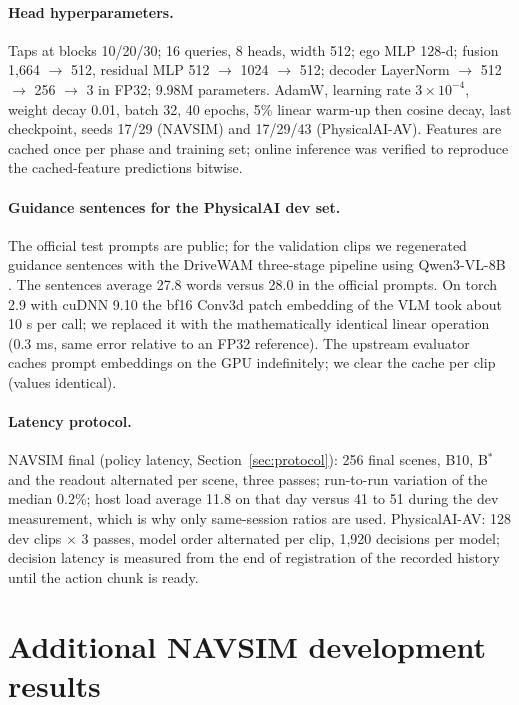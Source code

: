 \documentclass[10pt]{article}
\newcommand{\Bstar}{B$^{*}$}
\begin{document}
\paragraph{Head hyperparameters.} Taps at blocks 10/20/30; 16 queries, 8 heads, width 512; ego MLP 128-d; fusion 1,664 $\rightarrow$ 512, residual MLP 512 $\rightarrow$ 1024 $\rightarrow$ 512; decoder LayerNorm $\rightarrow$ 512 $\rightarrow$ 256 $\rightarrow$ 3 in FP32; 9.98M parameters. AdamW, learning rate $3 \times 10^{-4}$, weight decay 0.01, batch 32, 40 epochs, 5\% linear warm-up then cosine decay, last checkpoint, seeds 17/29 (NAVSIM) and 17/29/43 (PhysicalAI-AV). Features are cached once per phase and training set; online inference was verified to reproduce the cached-feature predictions bitwise.

\paragraph{Guidance sentences for the PhysicalAI dev set.} The official test prompts are public; for the validation clips we regenerated guidance sentences with the DriveWAM three-stage pipeline using Qwen3-VL-8B \citep{bai2025qwen3vl}. The sentences average 27.8 words versus 28.0 in the official prompts. On torch 2.9 with cuDNN 9.10 the bf16 Conv3d patch embedding of the VLM took about 10 s per call; we replaced it with the mathematically identical linear operation (0.3 ms, same error relative to an FP32 reference). The upstream evaluator caches prompt embeddings on the GPU indefinitely; we clear the cache per clip (values identical).

\paragraph{Latency protocol.} NAVSIM final (policy latency, Section~\ref{sec:protocol}): 256 final scenes, B10, \Bstar{} and the readout alternated per scene, three passes; run-to-run variation of the median 0.2\%; host load average 11.8 on that day versus 41 to 51 during the dev measurement, which is why only same-session ratios are used. PhysicalAI-AV: 128 dev clips $\times$ 3 passes, model order alternated per clip, 1,920 decisions per model; decision latency is measured from the end of registration of the recorded history until the action chunk is ready.

\section{Additional NAVSIM development results}
\label{app:navsim-dev}
\end{document}

